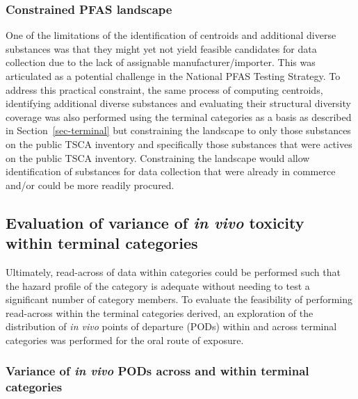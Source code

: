 \documentclass[
  super,
  preprint,
  3p]{elsarticle}
\begin{document}
\hypertarget{sec-constrained}{%
\subsubsection{Constrained PFAS landscape}\label{sec-constrained}}

One of the limitations of the identification of centroids and additional
diverse substances was that they might yet not yield feasible candidates
for data collection due to the lack of assignable manufacturer/importer.
This was articulated as a potential challenge in the National PFAS
Testing Strategy. To address this practical constraint, the same process
of computing centroids, identifying additional diverse substances and
evaluating their structural diversity coverage was also performed using
the terminal categories as a basis as described in
Section~\ref{sec-terminal} but constraining the landscape to only those
substances on the public TSCA inventory and specifically those
substances that were actives on the public TSCA inventory. Constraining
the landscape would allow identification of substances for data
collection that were already in commerce and/or could be more readily
procured.

\hypertarget{sec-invivo}{%
\subsection{\texorpdfstring{Evaluation of variance of \emph{in vivo}
toxicity within terminal
categories}{Evaluation of variance of in vivo toxicity within terminal categories}}\label{sec-invivo}}

Ultimately, read-across of data within categories could be performed
such that the hazard profile of the category is adequate without needing
to test a significant number of category members. To evaluate the
feasibility of performing read-across within the terminal categories
derived, an exploration of the distribution of \emph{in vivo} points of
departure (PODs) within and across terminal categories was performed for
the oral route of exposure.

\hypertarget{sec-rax}{%
\subsubsection{\texorpdfstring{Variance of \emph{in vivo} PODs across
and within terminal
categories}{Variance of in vivo PODs across and within terminal categories}}\label{sec-rax}}
\end{document}
